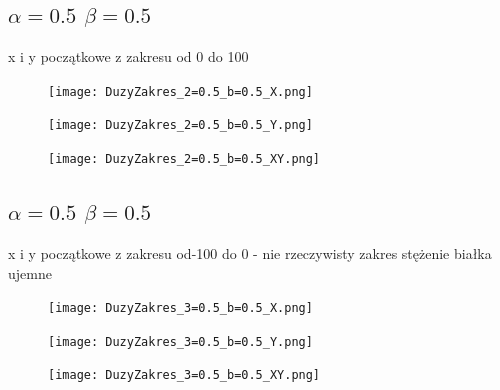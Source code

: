 \documentclass{article}
\begin{document}
    \newpage
    \subsection{$\alpha=0.5$ $\beta=0.5$}
    x i y początkowe z zakresu od 0 do 100
            \begin{figure}[ht]
        \centering
        \begin{minipage}{.5\textwidth}
            \centering
            \texttt{[image: DuzyZakres\_2=0.5\_b=0.5\_X.png]}
            \label{fig:test11}
        \end{minipage}%
        \begin{minipage}{.5\textwidth}
            \centering
            \texttt{[image: DuzyZakres\_2=0.5\_b=0.5\_Y.png]}
            \label{fig:test12}
        \end{minipage}
        \centering
        \begin{minipage}{.5\textwidth}
            \centering
            \texttt{[image: DuzyZakres\_2=0.5\_b=0.5\_XY.png]}
            \label{fig:test13}
        \end{minipage}%
    \end{figure}

    \newpage
    \subsection{$\alpha=0.5$ $\beta=0.5$}
    x i y początkowe z zakresu od-100 do 0 - nie rzeczywisty zakres stężenie białka ujemne
            \begin{figure}[ht]
        \centering
        \begin{minipage}{.5\textwidth}
            \centering
            \texttt{[image: DuzyZakres\_3=0.5\_b=0.5\_X.png]}
            \label{fig:test11}
        \end{minipage}%
        \begin{minipage}{.5\textwidth}
            \centering
            \texttt{[image: DuzyZakres\_3=0.5\_b=0.5\_Y.png]}
            \label{fig:test12}
        \end{minipage}
        \centering
        \begin{minipage}{.5\textwidth}
            \centering
            \texttt{[image: DuzyZakres\_3=0.5\_b=0.5\_XY.png]}
            \label{fig:test13}
        \end{minipage}%
    \end{figure}
\end{document}
